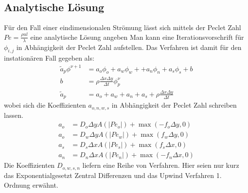 \documentclass{article}
\begin{document}
\subsection{Analytische Lösung }
Für den Fall einer eindimensionalen Strömung lässt sich
 mittels der Peclet Zahl $Pe = \frac{\rho u l }{\lambda}$ eine analytische Lösung angeben
 Man kann eine  Iterationsvorschrift für $\phi_{i,j}$ in Abhängigkeit der Peclet Zahl aufstellen. 
 Das Verfahren ist damit für den instationären Fall gegeben als:
 \begin{align}
 \tilde{a}_p \phi^{\nu+1} &= a_o \phi_o+a_w \phi_w+ + a_n \phi_n+a_s\phi_s + b \\
 b &= \rho \frac{\Delta x \Delta y}{  \Delta t}\phi_p^{\nu} \\
 \tilde{a}_p &= a_o + a_w+a_n+a_s + \rho \frac{\Delta x \Delta y}{  \Delta t}
 \end{align}
wobei sich die Koeffizienten $a_{o,n,w,s}$ in Abhängigkeit der Peclet Zahl schreiben lassen.
\begin{align*}
a_{o} &= D_{o} \Delta y A(|Pe_{o}|) + \max (-f_{o} \Delta y , 0)\\
a_{o} &= D_{w} \Delta y A(|Pe_{w}|) + \max (f_{w} \Delta y , 0)\\
a_{s} &= D_{s} \Delta x A(|Pe_{s}|) + \max (f_{s} \Delta x , 0)\\
a_{n} &= D_{n} \Delta x A(|Pe_{n}|) + \max (-f_{n} \Delta x , 0)
\end{align*}
Die Koeffizienten $D_{o,w,s,n}$ liefern eine Reihe von Verfahren. Hier seien nur kurz das Exponentialgesetzt
Zentral Differenzen und das Upwind Verfahren 1. Ordnung erwähnt.
\end{document}
